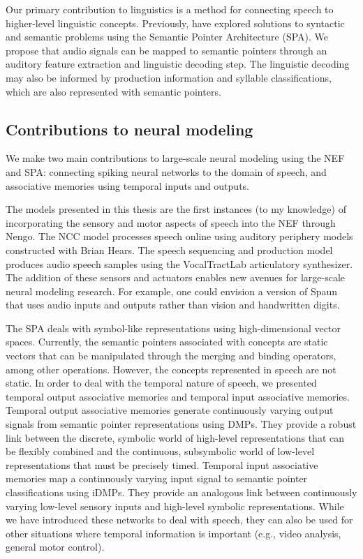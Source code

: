 Our primary contribution to linguistics
is a method for connecting speech
to higher-level linguistic concepts.
Previously, \citet{blouw2013,blouw2015,stewart2015}
have explored solutions to
syntactic and semantic problems
using the Semantic Pointer Architecture (SPA).
We propose that audio signals
can be mapped to semantic pointers
through an auditory feature extraction
and linguistic decoding step.
The linguistic decoding may also be informed
by production information
and syllable classifications,
which are also represented with semantic pointers.

\subsection{Contributions to neural modeling}

We make two main contributions to
large-scale neural modeling using the NEF and SPA:
connecting spiking neural networks
to the domain of speech,
and associative memories using
temporal inputs and outputs.

The models presented in this thesis
are the first instances (to my knowledge)
of incorporating the sensory and motor
aspects of speech into the NEF
through Nengo.
The NCC model processes speech online
using auditory periphery models
constructed with Brian Hears.
The speech sequencing and production model
produces audio speech samples
using the VocalTractLab articulatory synthesizer.
The addition of these sensors and actuators
enables new avenues
for large-scale neural modeling research.
For example,
one could envision a version of Spaun
that uses audio inputs and outputs
rather than vision and handwritten digits.

The SPA deals with symbol-like representations
using high-dimensional vector spaces.
Currently, the semantic pointers
associated with concepts are
static vectors that can be manipulated
through the merging and binding operators,
among other operations.
However, the concepts represented in speech
are not static.
In order to deal with the temporal nature of speech,
we presented temporal output associative memories
and temporal input associative memories.
Temporal output associative memories
generate continuously varying output signals
from semantic pointer representations
using DMPs.
They provide a robust link between the discrete,
symbolic world of high-level representations
that can be flexibly combined
and the continuous, subsymbolic world
of low-level representations that must
be precisely timed.
Temporal input associative memories
map a continuously varying input signal
to semantic pointer classifications
using iDMPs.
They provide an analogous link between
continuously varying low-level sensory inputs
and high-level symbolic representations.
While we have introduced these networks
to deal with speech,
they can also be used for other
situations where temporal information
is important (e.g., video analysis,
general motor control).

